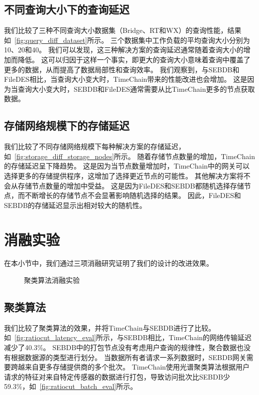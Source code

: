 \subsection{不同查询大小下的查询延迟}
我们比较了三种不同查询大小数据集（Bridge、RT和WX）的查询性能，结果如~\autoref{fig:query_diff_dataset}所示。
三个数据集中工作负载的平均查询大小分别为10、20和40。
我们可以发现，这三种解决方案的查询延迟通常随着查询大小的增加而降低。
这可以归因于这样一个事实，即更大的查询大小意味着查询中覆盖了更多的数据，从而提高了数据局部性和查询效率。
我们观察到，与SEBDB和FileDES相比，当查询大小变大时，TimeChain带来的性能改进也会增加。
这是因为当查询大小变大时，SEBDB和FileDES通常需要从比TimeChain更多的节点获取数据。

\subsection{存储网络规模下的存储延迟}
我们比较了不同存储网络规模下每种解决方案的存储延迟，如~\autoref{fig:storage_diff_storage_nodes}所示。
随着存储节点数量的增加，TimeChain的存储延迟呈下降趋势。
这是因为当节点数量增加时，TimeChain中的网关可以选择更多的存储提供程序，这增加了选择更近节点的可能性。
其他解决方案将不会从存储节点数量的增加中受益。
这是因为FileDES和SEBDB都随机选择存储节点，而不断增长的存储节点不会显著影响随机选择的结果。
因此，FileDES和SEBDB的存储延迟显示出相对较大的随机性。

\section{消融实验}
在本小节中，我们通过三项消融研究证明了我们的设计的改进效果。

\begin{figure*}[t]
    \centering
	\begin{minipage}{0.8\linewidth}
        \caption{聚类算法消融实验} 
    \end{minipage}
\end{figure*}

\subsection{聚类算法}
我们比较了聚类算法的效果，并将TimeChain与SEBDB进行了比较。
如~\autoref{fig:ratiocut_latency_eval}所示，与SEBDB相比，TimeChain的网络传输延迟减少了40.3\%。
SEBDB中的打包节点没有考虑用户查询的规律性，聚合数据也没有根据数据源的类型进行划分。
当数据所有者请求一系列数据时，SEBDB网关需要跨越来自更多存储提供商的多个批次。
TimeChain使用光谱聚类算法根据用户请求的特征对来自特定传感器的数据进行打包，导致访问批次比SEBDB少59.3\%，如~\autoref{fig:ratiocut_batch_eval}所示。

